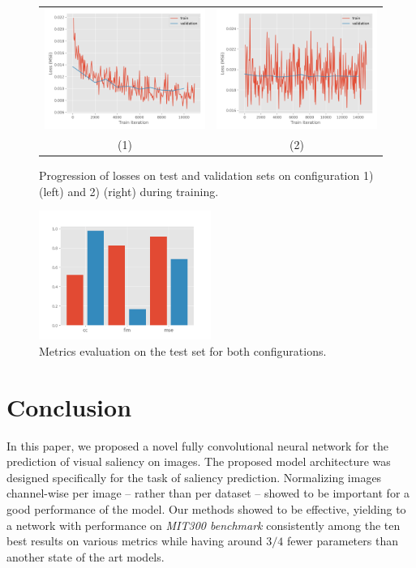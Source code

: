 \documentclass[10pt,twocolumn,letterpaper]{article}
\begin{document}
\begin{figure}
\begin{center}
\begin{tabular} {cc}
\includegraphics[width=0.45\linewidth]{./img/lab_perimg_losses.png} &
\includegraphics[width=0.45\linewidth]{./img/rgb_perdset_losses.png}\\
(1) & (2)
\end{tabular}
\caption{Progression of losses on test and validation
    sets on configuration 1) (left) and 2) (right) during training.}
\label{fig:confs_losses}
\end{center}
\end{figure}

\begin{center}
\begin{figure}[t]
\includegraphics[width=0.5\textwidth]{./img/metrics.png}
\caption{Metrics evaluation on the test set for both configurations.}
\label{fig:confs_metrics}
\end{figure}
\end{center}

\section{Conclusion}
In this paper, we proposed a novel fully convolutional neural network for the
prediction of visual saliency on images.
The proposed model architecture was designed specifically
for the task of saliency prediction.
Normalizing images channel-wise per image -- rather than per dataset -- showed
to be important for a good performance of the model.
Our methods showed to be effective, yielding to a network with performance
on \emph{MIT300 benchmark} consistently among the ten best results on various
metrics while having around $3/4$  fewer parameters than another state of
the art models.

{\small


}
\end{document}
